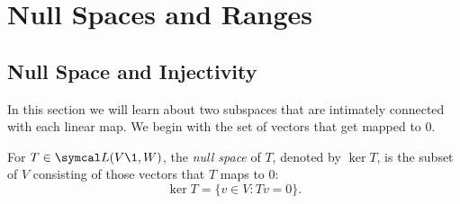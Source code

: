 \begin{exercises}

\end{exercises}

\CrCom

\section{Null Spaces and Ranges} \label{3nullspace}

\subsection{Null Space and Injectivity}

In this section we will learn about two subspaces that are intimately connected with each linear map. We begin with the set of vectors that get mapped to $0$.

{For $T \in \L(V\1,W)$, the \emph{null space} of $T$, denoted by $\ker T$, is the subset of $V$ consisting of
those vectors that $T$ maps to $0$:
\[
\ker T = \{v \in V: Tv = 0 \}.
\]
}

